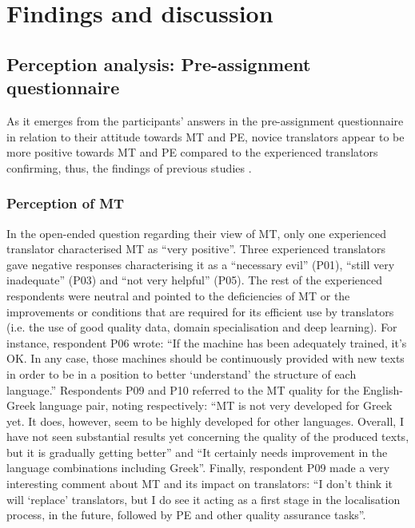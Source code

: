 \documentclass[output=paper]{langscibook}
\begin{document}
\section{Findings and discussion}

\subsection{Perception analysis: Pre-assignment questionnaire}\largerpage
As it emerges from the participants’ answers in the pre-assignment questionnaire in relation to their attitude towards MT and PE, novice translators appear to be more positive towards MT and PE compared to the experienced translators confirming, thus, the findings of previous studies \citep{moorkens-obrien-2015-post, García2010, Yamada2015}.

\subsubsection{Perception of MT}
In the open-ended question regarding their view of MT, only one experienced translator characterised MT as “very positive”. Three experienced translators gave negative responses characterising it as a “necessary evil” (P01), “still very inadequate” (P03) and “not very helpful” (P05). The rest of the experienced respondents were neutral and pointed to the deficiencies of MT or the improvements or conditions that are required for its efficient use by translators (i.e. the use of good quality data, domain specialisation and deep learning). For instance, respondent P06 wrote: “If the machine has been adequately trained, it’s OK. In any case, those machines should be continuously provided with new texts in order to be in a position to better ‘understand’ the structure of each language.” Respondents P09 and P10 referred to the MT quality for the English-Greek language pair, noting respectively: “MT is not very developed for Greek yet. It does, however, seem to be highly developed for other languages. Overall, I have not seen substantial results yet concerning the quality of the produced texts, but it is gradually getting better” and “It certainly needs improvement in the language combinations including Greek”. Finally, respondent P09 made a very interesting comment about MT and its impact on translators: “I don't think it will ‘replace’ translators, but I do see it acting as a first stage in the localisation process, in the future, followed by PE and other quality assurance tasks”.
\end{document}

